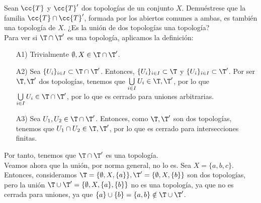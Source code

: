 \begin{ejercicio}
    Sean $\cc{T}$ y $\cc{T}'$ dos topologías de un conjunto $X$. Demuéstrese que la familia $\cc{T}\cap \cc{T}'$, formada por los abiertos comunes a ambas, es también una topología de $X$. ¿Es la unión de dos topologías una topología?\\

    Para ver si $\T\cap \T'$ es una topología, aplicamos la definición:
    \begin{enumerate}
        \item[A1)] Trivialmente $\emptyset, X\in \T\cap \T'$.

        \item[A2)] Sea $\{U_i\}_{i\in I} \subset \T\cap \T'$. Entonces, $\{U_i\}_{i\in I} \subset \T$ y $\{U_i\}_{i\in I} \subset \T'$. Por ser $\T,\T'$ dos topologías, tenemos que $\bigcup\limits_{i\in I}U_i\in \T,\T'$, por lo que $\bigcup\limits_{i\in I}U_i\in \T\cap \T'$, por lo que es cerrado para uniones arbitrarias.

        \item[A3)] Sea $U_1,U_2\in \T\cap \T'$. Entonces, como $\T,\T'$ son dos topologías, tenemos que $U_1\cap U_2\in \T,\T'$, por lo que es cerrado para intersecciones finitas.
    \end{enumerate}
    Por tanto, tenemos que $\T\cap \T'$ es una topología.\\

    Veamos ahora que la unión, por norma general, no lo es. Sea $X=\{a,b,c\}$. Entonces, consideramos $\T=\{\emptyset,X,\{a\}\}, \T'=\{\emptyset,X,\{b\}\}$ son dos topologías, pero la unión $\T\cup \T'=\{\emptyset,X,\{a\},\{b\}\}$ no es una topología, ya que no es cerrada para uniones, ya que $\{a\}\cup \{b\}=\{a,b\}\notin \T\cup \T'$.
\end{ejercicio}


